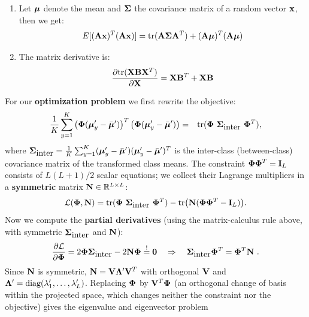 	\begin{enumerate}
		\item Let $\bm{\mathrm{\mu}}$ denote the mean and $\mathbf{\Sigma}$ the covariance matrix of a random vector $\bm{\mathrm{x}}$, then we get:
		      \begin{displaymath}
			      E[(\mathbf{A} \bm{\mathrm{x}})^T(\mathbf{A} \bm{\mathrm{x}})] =
			      {\mbox{tr}}(\mathbf{A} \mathbf{\Sigma} \mathbf{A}^T) + (\mathbf{A} \bm{\mathrm{\mu}})^T(\mathbf{A}\bm{\mathrm{\mu}})
		      \end{displaymath}
		\item The matrix derivative is:
		      \begin{displaymath}
			      \frac{\partial \mbox{tr}( \mathbf{X} \mathbf{B} \mathbf{X}^T)}{\partial \mathbf{X}} = \mathbf{X}\mathbf{B}^T +\mathbf{X}\mathbf{B}
		      \end{displaymath}
	\end{enumerate}
For our \textbf{optimization problem} we first rewrite the objective:
	\begin{eqnarray*}
		\frac{1}{K} \sum_{y=1}^K \left( \mat\Phi (\vect{\mu}'_y - \bar{\vect{\mu}}') \right)^T
		\left( \mat\Phi (\vect{\mu}'_y - \bar{\vect{\mu}}') \right)
		&=& \mbox{tr} (\mat\Phi \ \mat \Sigma_{\mbox{inter}} \ \mat\Phi^T),
	\end{eqnarray*}
	{\small where $\mathbf{\Sigma}_{\mbox{inter}} = \frac{1}{K}\sum_{y=1}^K (\bm{\mathrm{\mu}}'_y - \bar{\bm{\mathrm{\mu}}}')(\bm{\mathrm{\mu}}'_y - \bar{\bm{\mathrm{\mu}}}')^T$ is the inter-class (between-class) covariance matrix of the transformed class means.}
	The constraint $\mathbf{\Phi}\mathbf{\Phi}^T=\mathbf{I}_L$ consists of $L(L+1)/2$ scalar equations; we collect their Lagrange multipliers in a \textbf{symmetric} matrix $\mathbf{N}\in\mathbb{R}^{L\times L}$:
	\begin{displaymath}
		\mathcal L(\mat\Phi,\mat N)=\mbox{tr} (\mat\Phi \ \mat \Sigma_{\mbox{inter}} \ \mat\Phi^T) - \mbox{tr}\big(\mat N(\mat\Phi\mat\Phi^T-\mat I_L)\big).
	\end{displaymath}
Now we compute the \textbf{partial derivatives} (using the matrix-calculus rule above, with symmetric $\mathbf{\Sigma}_{\mbox{inter}}$ and $\mathbf{N}$):
	\begin{displaymath}
		\frac{\partial\mathcal L}{\partial{\ensuremath{\mathbf{\Phi}}}} =
		2 \mathbf{\Phi}\mathbf{\Sigma}_{\mbox{inter}} -2 \mathbf{N} \mathbf{\Phi} \stackrel{!}{=} \mathbf{0}
		\quad\Rightarrow\quad
		\mathbf{\Sigma}_{\mbox{inter}} \mathbf{\Phi}^T = \mathbf{\Phi}^T \mathbf{N}~.
	\end{displaymath}
	Since $\mathbf{N}$ is symmetric, $\mathbf{N}=\mathbf{V}\mathbf{\Lambda}'\mathbf{V}^T$ with orthogonal $\mathbf{V}$ and $\mathbf{\Lambda}'=\mbox{diag}(\lambda'_1,\dots,\lambda'_L)$. Replacing $\mathbf{\Phi}$ by $\mathbf{V}^T\mathbf{\Phi}$ (an orthogonal change of basis within the projected space, which changes neither the constraint nor the objective) gives the eigenvalue and eigenvector problem
